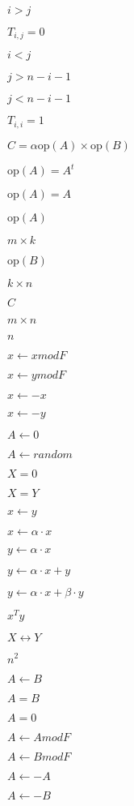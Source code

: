 \documentclass{article}
\begin{document}
$i>j$
\pagebreak

$T_{i,j} = 0$
\pagebreak

$i<j$
\pagebreak

$j>n-i-1$
\pagebreak

$j<n-i-1$
\pagebreak

$T_{i,i} = 1$
\pagebreak

$C = \alpha \mathrm{op}(A) \times \mathrm{op}(B)$
\pagebreak

$\mathrm{op}(A)=A^t$
\pagebreak

$\mathrm{op}(A)=A$
\pagebreak

$\mathrm{op}(A)$
\pagebreak

$m \times k$
\pagebreak

$\mathrm{op}(B)$
\pagebreak

$k \times n$
\pagebreak

$C$
\pagebreak

$m \times n$
\pagebreak

$n$
\pagebreak

$x \gets  x mod F$
\pagebreak

$x \gets  y mod F$
\pagebreak

$x \gets - x$
\pagebreak

$x \gets - y$
\pagebreak

$A \gets 0 $
\pagebreak

$A \gets random $
\pagebreak

$X = 0 $
\pagebreak

$X = Y $
\pagebreak

$x \gets y $
\pagebreak

$x \gets \alpha \cdot x$
\pagebreak

$y \gets \alpha \cdot x$
\pagebreak

$y \gets \alpha \cdot x + y$
\pagebreak

$y \gets \alpha \cdot x + \beta \cdot y$
\pagebreak

$x^T  y$
\pagebreak

$ X \leftrightarrow Y$
\pagebreak

$n^2$
\pagebreak

$A \gets B $
\pagebreak

$A = B $
\pagebreak

$A = 0 $
\pagebreak

$A \gets  A mod F$
\pagebreak

$A \gets  B mod F$
\pagebreak

$A \gets - A$
\pagebreak

$A \gets  - B$
\pagebreak
\end{document}
